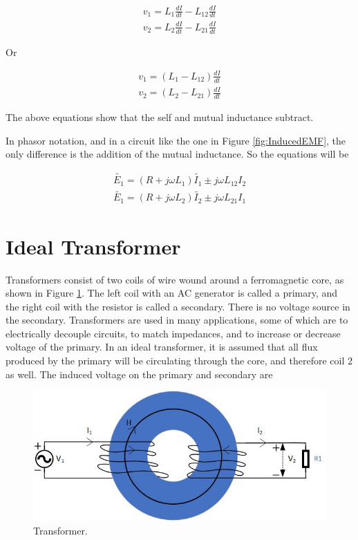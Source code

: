 \documentclass{ximera}
\begin{document}
\begin{eqnarray}
v_1=  L_1 \frac{dI}{dt} - L_{12} \frac{dI}{dt} \\
v_2= L_2 \frac{dI}{dt} - L_{21} \frac{dI}{dt}
\end{eqnarray}


Or

\begin{eqnarray}
v_1=  (L_1  - L_{12}) \frac{dI}{dt} \\
v_2= (L_2 - L_{21}) \frac{dI}{dt}
\end{eqnarray}




The above equations show that the self and mutual inductance subtract.



In phasor notation, and in a circuit like the one in Figure \ref{fig:InducedEMF}, the only difference is the addition of the mutual inductance. So the equations will be



\begin{eqnarray}
\tilde{E_1} = (R + j \omega L_1) \tilde{I_1} \pm j \omega L_{12} I_2 \\
\tilde{E_1} = (R + j \omega L_2) \tilde{I_2} \pm j \omega L_{21} I_1 
\end{eqnarray}

\section{Ideal Transformer}

Transformers consist of two coils of wire wound around a ferromagnetic core, as shown in Figure \ref{fig:Transformer}. The left coil with an AC generator is called a primary, and the right coil with the resistor is called a secondary. There is no voltage source in the secondary. Transformers are used in many applications, some of which are  to electrically decouple circuits, to match impedances, and to increase or decrease voltage of the primary. In an ideal transformer, it is assumed that all flux produced by the primary will be circulating through the core, and therefore coil 2 as well. The induced voltage on the primary and secondary are 

\begin{figure}[htbp]
\begin{center}
\includegraphics[scale=0.8]{../jpg/Transformer.jpg}
\end{center}
\caption{Transformer.}
\label{fig:Transformer}
\end{figure}
\end{document}
